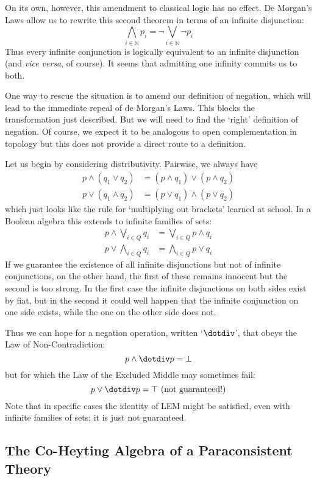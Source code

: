 \documentclass[oneside,english]{article}
\theoremstyle{plain}
\theoremstyle{definition}
\theoremstyle{definition}
\begin{document}
On its own, however, this amendment to classical logic has no effect. De Morgan's Laws allow us to rewrite this second theorem in terms of an infinite disjunction:
\[
	\bigwedge_{i\in\mathbb{N}} p_i = \lnot \bigvee_{i\in\mathbb{N}} \lnot p_i
\]
Thus every infinite conjunction is logically equivalent to an infinite disjunction (and \emph{vice versa}, of course). It seems that admitting one infinity commits us to both.

One way to rescue the situation is to amend our definition of negation, which will lead to the immediate repeal of de Morgan's Laws. This blocks the transformation just described. But we will need to find the `right' definition of negation. Of course, we expect it to be analogous to open complementation in topology but this does not provide a direct route to a definition.

Let us begin by considering distributivity. Pairwise, we always have
\[
	\begin{split}
		p\land(q_1\lor q_2) &= (p\land q_1)\lor (p\land q_2) \\
		p\lor(q_1\land q_2) &= (p\lor q_1)\land (p\lor q_2)
	\end{split}
\]
which just looks like the rule for `multiplying out brackets' learned at school. In a Boolean algebra this extends to infinite families of sets:
\[
	\begin{split}
		p\land\bigvee_{i\in Q} q_i &= \bigvee_{i\in Q} p\land q_i \\
		p\lor\bigwedge_{i\in Q} q_i &= \bigwedge_{i\in Q} p\lor q_i
	\end{split}
\]
If we guarantee the existence of all infinite disjunctions but not of infinite conjunctions, on the other hand, the first of these remains innocent but the second is too strong. In the first case the infinite disjunctions on both sides exist by fiat, but in the second it could well happen that the infinite conjunction on one side exists, while the one on the other side does not. 

Thus we can hope for a negation operation, written `$\dotdiv$', that obeys the Law of Non-Contradiction:
\[
	p \land \dotdiv p = \bot
\]
but for which the Law of the Excluded Middle may sometimes fail:
\[
	p \lor \dotdiv p = \top \ \text{(not guaranteed!)}
\]
Note that in specific cases the identity of LEM might be satisfied, even with infinite families of sets; it is just not guaranteed.

\subsection{The Co-Heyting Algebra of a Paraconsistent Theory}
\end{document}
